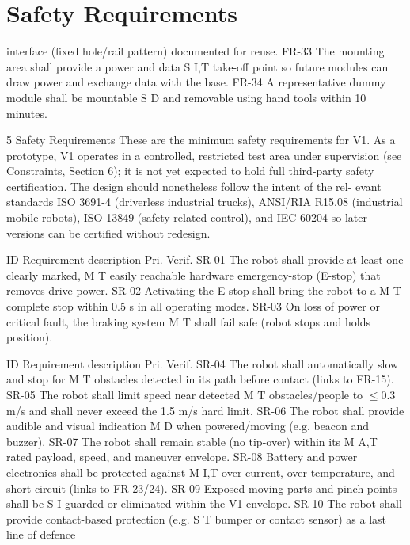 \chapter{Safety Requirements}

interface (fixed hole/rail pattern) documented for reuse. FR-33       The mounting area shall provide a power and data                 S           I,T take-off point so future modules can draw power and exchange data with the base. FR-34       A representative dummy module shall be mountable                 S            D and removable using hand tools within 10 minutes.

5 Safety Requirements These are the minimum safety requirements for V1. As a prototype, V1 operates in a controlled, restricted test area under supervision (see Constraints, Section 6); it is not yet expected to hold full third-party safety certification. The design should nonetheless follow the intent of the rel- evant standards ISO 3691-4 (driverless industrial trucks), ANSI/RIA R15.08 (industrial mobile robots), ISO 13849 (safety-related control), and IEC 60204 so later versions can be certified without redesign.

ID          Requirement description                                        Pri.         Verif. SR-01       The robot shall provide at least one clearly marked,            M             T easily reachable hardware emergency-stop (E-stop) that removes drive power. SR-02       Activating the E-stop shall bring the robot to a                M             T complete stop within 0.5 s in all operating modes. SR-03       On loss of power or critical fault, the braking system          M             T shall fail safe (robot stops and holds position).

ID          Requirement description                                         Pri.          Verif. SR-04       The robot shall automatically slow and stop for                     M           T obstacles detected in its path before contact (links to FR-15). SR-05       The robot shall limit speed near detected                           M           T obstacles/people to $\leq$0.3 m/s and shall never exceed the 1.5 m/s hard limit. SR-06       The robot shall provide audible and visual indication               M           D when powered/moving (e.g. beacon and buzzer). SR-07       The robot shall remain stable (no tip-over) within its              M          A,T rated payload, speed, and maneuver envelope. SR-08       Battery and power electronics shall be protected against            M          I,T over-current, over-temperature, and short circuit (links to FR-23/24). SR-09       Exposed moving parts and pinch points shall be                      S            I guarded or eliminated within the V1 envelope. SR-10       The robot shall provide contact-based protection (e.g.              S           T bumper or contact sensor) as a last line of defence

